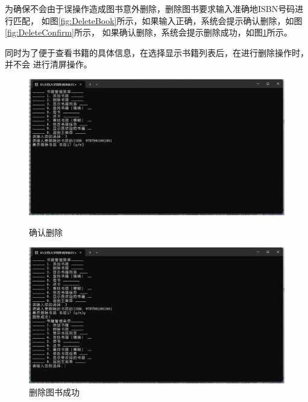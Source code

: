 \documentclass[12pt,twoside]{ctexart}
\begin{document}
为确保不会由于误操作造成图书意外删除，删除图书要求输入准确地ISBN号码进行匹配，
如图\ref{fig:DeleteBook}所示，如果输入正确，系统会提示确认删除，如图\ref{fig:DeleteConfirm}所示，
如果确认删除，系统会提示删除成功，如图\ref{fig:Confirmed}所示。

同时为了便于查看书籍的具体信息，在选择显示书籍列表后，在进行删除操作时，并不会
进行清屏操作。

\begin{figure}[H]
    \centering
    \begin{minipage}{0.48\textwidth}
        \centering
        \includegraphics[width=\linewidth]{Book/DeleteConfirm.png}
        \caption{确认删除}
        \label{fig:DeleteConfirm}
    \end{minipage}
    \hfill
    \begin{minipage}{0.48\textwidth}
        \centering
        \includegraphics[width=\linewidth]{Book/Confirmed.png}
        \caption{删除图书成功}
        \label{fig:Confirmed}
    \end{minipage}
\end{figure}
\end{document}

